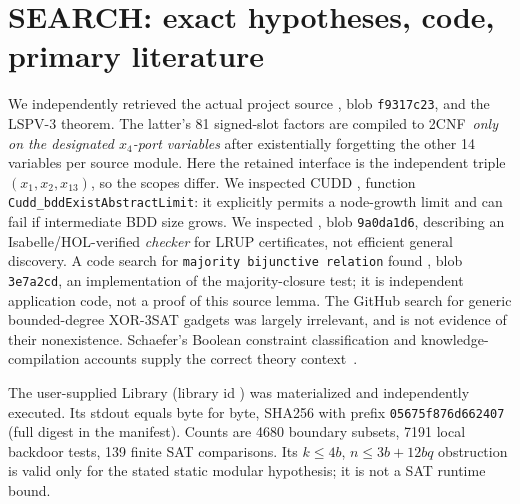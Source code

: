 \documentclass[11pt]{article}
\begin{document}
\section{SEARCH: exact hypotheses, code, primary literature}
We independently retrieved the actual project source , blob \texttt{f9317c23}, and the LSPV-3  theorem. The latter's 81 signed-slot factors are compiled to 2CNF \,\emph{only on the designated $x_4$-port variables} after existentially forgetting the other 14 variables per source module. Here the retained interface is the independent triple $(x_1,x_2,x_{13})$, so the scopes differ. We inspected CUDD , function \texttt{Cudd\_bddExistAbstractLimit}: it explicitly permits a node-growth limit and can fail if intermediate BDD size grows. We inspected , blob \texttt{9a0da1d6}, describing an Isabelle/HOL-verified \emph{checker} for LRUP certificates, not efficient general discovery. A code search for \texttt{majority bijunctive relation} found , blob \texttt{3e7a2cd}, an implementation of the majority-closure test; it is independent application code, not a proof of this source lemma. The GitHub search for generic bounded-degree XOR-3SAT gadgets was largely irrelevant, and is not evidence of their nonexistence. Schaefer's Boolean constraint classification and knowledge-compilation accounts supply the correct theory context~\cite{schaefer1978,darwiche2002}.

The user-supplied Library  (library id ) was materialized and independently executed. Its  stdout equals  byte for byte, SHA256 with prefix \texttt{05675f876d662407} (full digest in the manifest). Counts are 4680 boundary subsets, 7191 local backdoor tests, 139 finite SAT comparisons. Its $k\le4b$, $n\le3b+12bq$ obstruction is valid only for the stated static modular hypothesis; it is not a SAT runtime bound.
\end{document}
